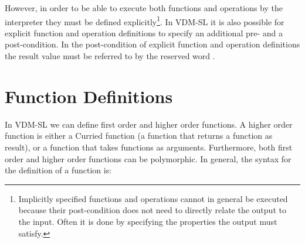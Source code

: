 \documentclass[\pformat,12pt]{article}
\newcommand{\vdmslpp}[2]{%
#1
}
\newcommand{\vdmpp}{VDM++}
\begin{document}
However, in order to be able to execute both functions and operations
by the interpreter they must be defined explicitly\footnote{Implicitly
specified functions and operations cannot in general be executed
because their post-condition does not need to directly relate the
output to the input. Often it is done by specifying the properties the
output must satisfy.}. In \vdmslpp{ VDM-SL}{\vdmpp} it is also
possible for explicit function and operation definitions to specify an
additional pre- and a post-condition.  In the post-condition of 
explicit function and operation definitions the result value must be
referred to by the reserved word .
 
\section{Function Definitions}\label{functiondef}

In \vdmslpp{ VDM-SL}{\vdmpp} we can define first order and higher order
functions. A higher order function is either a Curried function
(a function that returns a function as result), or a function that takes
functions as arguments. Furthermore, both first order and higher order
functions can be polymorphic. In general, the syntax for the definition of a
function is:






\end{document}
